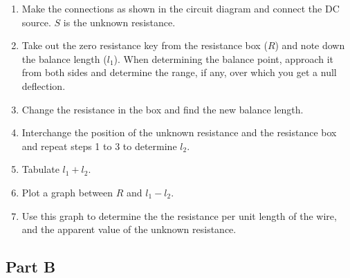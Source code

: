 \begin{enumerate}
    \item Make the connections as shown in the circuit diagram and connect the DC source. $S$ is the unknown resistance.
    \item Take out the zero resistance key from the resistance box ($R$) and note down the balance length ($l_1$). When determining the balance point, approach it from both sides and determine the range, if any, over which you get a null deflection. 
    \item Change the resistance in the box and find the new balance length.
    \item Interchange the position of the unknown resistance and the resistance box and repeat steps 1 to 3 to determine $l_2$.
    \item Tabulate $l_1 + l_2$.
    \item Plot a graph between $R$ and $l_1 -l_2$.
    \item Use this graph to determine the the resistance per unit length of the wire, and the apparent value of the unknown resistance.
\end{enumerate}

\subsection*{Part B}


